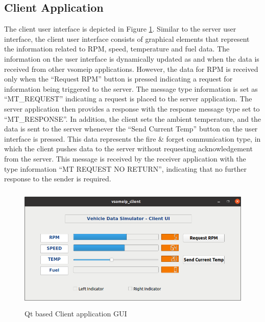 \subsection{Client Application}
The client user interface is depicted in Figure \ref{fig:clientUI}. Similar to the server user interface, the client user interface consists of graphical elements that represent the information related to RPM, speed, temperature and fuel data. The information on the user interface is dynamically updated as and when the data is received from other vsomeip applications. However, the data for RPM is received only when the “Request RPM” button is pressed indicating a request for information being triggered to the server. The message type information is set as “MT\_REQUEST” indicating a request is placed to the server application. The server application then provides a response with the response message type set to “MT\_RESPONSE”.  In addition, the client sets the ambient temperature, and the data is sent to the server whenever the “Send Current Temp” button on the user interface is pressed. This data represents the fire \& forget communication type, in which the client pushes data to the server without requesting acknowledgement from the server. This message is received by the receiver application with the type information “MT REQUEST NO RETURN”, indicating that no further response to the sender is required.

\begin{figure}[!htb] 

	\centering
		\includegraphics[width=1\textwidth,height=6cm]{images/clientUI.png}
	\caption{Qt based Client application GUI}
	\label{fig:clientUI}
\end{figure}

